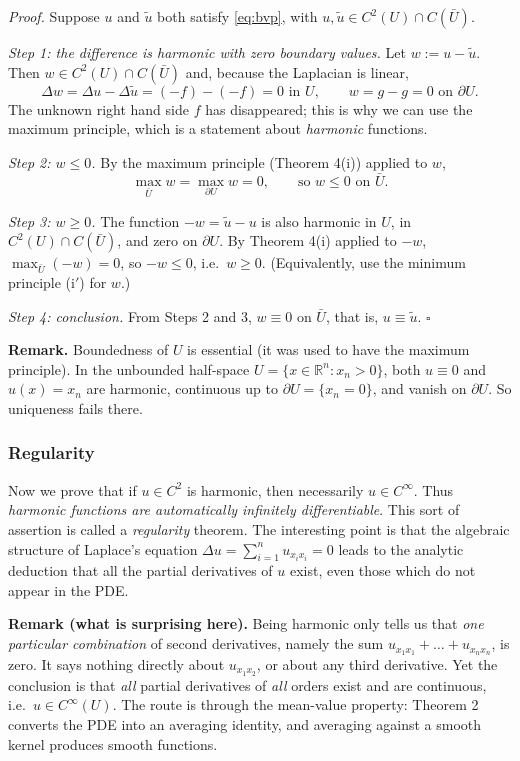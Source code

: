 \documentclass[11pt]{article}
\theoremstyle{plain}
\theoremstyle{definition}
\theoremstyle{remark}
\begin{document}
\textit{Proof.} Suppose $u$ and $\tilde u$ both satisfy \eqref{eq:bvp}, with $u, \tilde u \in C^2(U)\cap C(\bar U)$.

\emph{Step 1: the difference is harmonic with zero boundary values.} Let $w := u - \tilde u$. Then $w \in C^2(U) \cap C(\bar U)$ and, because the Laplacian is linear,
$$ \Delta w = \Delta u - \Delta\tilde u = (-f) - (-f) = 0 \text{ in } U, \qquad w = g - g = 0 \text{ on } \partial U. $$
The unknown right hand side $f$ has disappeared; this is why we can use the maximum principle, which is a statement about \emph{harmonic} functions.

\emph{Step 2: $w \leq 0$.} By the maximum principle (Theorem 4(i)) applied to $w$,
$$ \max_{\bar U} w = \max_{\partial U} w = 0, \qquad\text{so } w \leq 0 \text{ on } \bar U. $$

\emph{Step 3: $w \geq 0$.} The function $-w = \tilde u - u$ is also harmonic in $U$, in $C^2(U)\cap C(\bar U)$, and zero on $\partial U$. By Theorem 4(i) applied to $-w$, $\max_{\bar U}(-w) = 0$, so $-w \leq 0$, i.e.\ $w \geq 0$. (Equivalently, use the minimum principle (i$'$) for $w$.)

\emph{Step 4: conclusion.} From Steps 2 and 3, $w \equiv 0$ on $\bar U$, that is, $u \equiv \tilde u$. $\square$

\textbf{Remark.} Boundedness of $U$ is essential (it was used to have the maximum principle). In the unbounded half-space $U = \{x \in \mathbb{R}^n : x_n > 0\}$, both $u \equiv 0$ and $u(x) = x_n$ are harmonic, continuous up to $\partial U = \{x_n = 0\}$, and vanish on $\partial U$. So uniqueness fails there.

\subsubsection{Regularity}
Now we prove that if $u \in C^2$ is harmonic, then necessarily $u \in C^\infty$. Thus \emph{harmonic functions are automatically infinitely differentiable}. This sort of assertion is called a \emph{regularity} theorem. The interesting point is that the algebraic structure of Laplace's equation $\Delta u = \sum_{i=1}^n u_{x_i x_i} = 0$ leads to the analytic deduction that all the partial derivatives of $u$ exist, even those which do not appear in the PDE.

\textbf{Remark (what is surprising here).} Being harmonic only tells us that \emph{one particular combination} of second derivatives, namely the sum $u_{x_1x_1} + \dots + u_{x_nx_n}$, is zero. It says nothing directly about $u_{x_1 x_2}$, or about any third derivative. Yet the conclusion is that \emph{all} partial derivatives of \emph{all} orders exist and are continuous, i.e.\ $u \in C^\infty(U)$. The route is through the mean-value property: Theorem 2 converts the PDE into an averaging identity, and averaging against a smooth kernel produces smooth functions.
\end{document}
